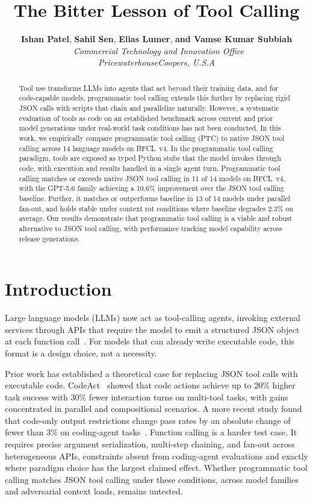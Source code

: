 \documentclass[11pt]{article}
\title{The Bitter Lesson of Tool Calling}
\author{
 \textbf{Ishan Patel}, 
 \textbf{Sahil Sen}, 
 \textbf{Elias Lumer}, 
 \textbf{and Vamse Kumar Subbiah} \\
 \
 \textit{Commercial Technology and Innovation Office} \\\textit{PricewaterhouseCoopers, U.S.A}}
\date{}
\newcommand{\bfcl}{BFCL~v4}
\newcommand{\jsonmode}{JSON tool calling}
\newcommand{\nmodels}{14}
\begin{document}
\maketitle

\begin{abstract}
Tool use transforms LLMs into agents that act beyond their training data, and for
code-capable models, programmatic tool calling extends this further by replacing rigid JSON
calls with scripts that chain and parallelize naturally.
However, a systematic evaluation of tools as code on an established benchmark across
current and prior model generations under real-world task conditions has not been conducted.
In this work, we empirically compare programmatic tool calling (PTC) to native JSON tool calling
across \nmodels{} language models on \bfcl{}.
In the programmatic tool calling paradigm, tools are exposed as typed Python stubs that the model invokes
through code, with execution and results handled in a single agent turn.
Programmatic tool calling matches or exceeds native \jsonmode{} in 11 of 14 models on \bfcl{},
with the GPT-5.6 family achieving a 10.6\% improvement over the \jsonmode{} baseline.
Further, it matches or outperforms baseline in 13 of 14 models under parallel fan-out,
and holds stable under context rot conditions where baseline degrades 2.3\% on average.
Our results demonstrate that programmatic tool calling is a viable and robust alternative to
\jsonmode{}, with performance tracking model capability across release generations.
\end{abstract}

\section{Introduction}

Large language models (LLMs) now act as tool-calling agents, invoking external
services through APIs that require the model to emit a structured JSON object at
each function call~\citep{anthropicagents2024, deterministic2026}.
For models that can already write executable code, this format is a design
choice, not a necessity.

Prior work has established a theoretical case for replacing JSON tool calls with
executable code.
CodeAct~\citep{wang2024codeact} showed that code actions achieve up to 20\%
higher task success with 30\% fewer interaction turns on multi-tool tasks, with
gains concentrated in parallel and compositional scenarios.
A more recent study found that code-only output restrictions change pass rates by
an absolute change of fewer than 3\% on coding-agent tasks~\citep{kddcoding2026}.
Function calling is a harder test case. It requires precise argument serialization,
multi-step chaining, and fan-out across heterogeneous APIs, constraints absent
from coding-agent evaluations and exactly where paradigm choice has the largest
claimed effect.
Whether programmatic tool calling matches \jsonmode{} under these conditions,
across model families and adversarial context loads, remains untested.
\end{document}
